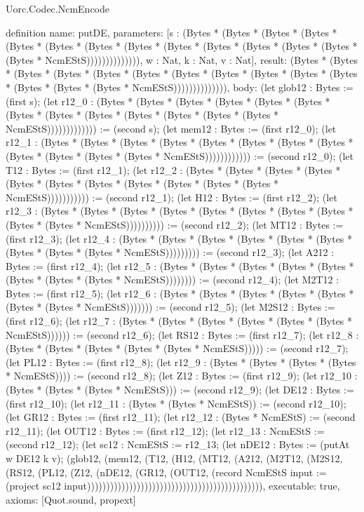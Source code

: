 \begin{lexlean}{Uorc.Codec.NcmEncode}
\begin{semanticmodule}
definition{
  name: putDE,
  parameters: [s : (Bytes * (Bytes * (Bytes * (Bytes * (Bytes * (Bytes * (Bytes * (Bytes * (Bytes * (Bytes * (Bytes * (Bytes * (Bytes * (Bytes * NcmEStS)))))))))))))), w : Nat, k : Nat, v : Nat],
  result: (Bytes * (Bytes * (Bytes * (Bytes * (Bytes * (Bytes * (Bytes * (Bytes * (Bytes * (Bytes * (Bytes * (Bytes * (Bytes * (Bytes * NcmEStS)))))))))))))),
  body: (let glob12 : Bytes := (first s); (let r12_0 : (Bytes * (Bytes * (Bytes * (Bytes * (Bytes * (Bytes * (Bytes * (Bytes * (Bytes * (Bytes * (Bytes * (Bytes * (Bytes * NcmEStS))))))))))))) := (second s); (let mem12 : Bytes := (first r12_0); (let r12_1 : (Bytes * (Bytes * (Bytes * (Bytes * (Bytes * (Bytes * (Bytes * (Bytes * (Bytes * (Bytes * (Bytes * (Bytes * NcmEStS)))))))))))) := (second r12_0); (let T12 : Bytes := (first r12_1); (let r12_2 : (Bytes * (Bytes * (Bytes * (Bytes * (Bytes * (Bytes * (Bytes * (Bytes * (Bytes * (Bytes * (Bytes * NcmEStS))))))))))) := (second r12_1); (let H12 : Bytes := (first r12_2); (let r12_3 : (Bytes * (Bytes * (Bytes * (Bytes * (Bytes * (Bytes * (Bytes * (Bytes * (Bytes * (Bytes * NcmEStS)))))))))) := (second r12_2); (let MT12 : Bytes := (first r12_3); (let r12_4 : (Bytes * (Bytes * (Bytes * (Bytes * (Bytes * (Bytes * (Bytes * (Bytes * (Bytes * NcmEStS))))))))) := (second r12_3); (let A212 : Bytes := (first r12_4); (let r12_5 : (Bytes * (Bytes * (Bytes * (Bytes * (Bytes * (Bytes * (Bytes * (Bytes * NcmEStS)))))))) := (second r12_4); (let M2T12 : Bytes := (first r12_5); (let r12_6 : (Bytes * (Bytes * (Bytes * (Bytes * (Bytes * (Bytes * (Bytes * NcmEStS))))))) := (second r12_5); (let M2S12 : Bytes := (first r12_6); (let r12_7 : (Bytes * (Bytes * (Bytes * (Bytes * (Bytes * (Bytes * NcmEStS)))))) := (second r12_6); (let RS12 : Bytes := (first r12_7); (let r12_8 : (Bytes * (Bytes * (Bytes * (Bytes * (Bytes * NcmEStS))))) := (second r12_7); (let PL12 : Bytes := (first r12_8); (let r12_9 : (Bytes * (Bytes * (Bytes * (Bytes * NcmEStS)))) := (second r12_8); (let Z12 : Bytes := (first r12_9); (let r12_10 : (Bytes * (Bytes * (Bytes * NcmEStS))) := (second r12_9); (let DE12 : Bytes := (first r12_10); (let r12_11 : (Bytes * (Bytes * NcmEStS)) := (second r12_10); (let GR12 : Bytes := (first r12_11); (let r12_12 : (Bytes * NcmEStS) := (second r12_11); (let OUT12 : Bytes := (first r12_12); (let r12_13 : NcmEStS := (second r12_12); (let sc12 : NcmEStS := r12_13; (let nDE12 : Bytes := (putAt w DE12 k v); (glob12, (mem12, (T12, (H12, (MT12, (A212, (M2T12, (M2S12, (RS12, (PL12, (Z12, (nDE12, (GR12, (OUT12, (record NcmEStS {input := (project sc12 input)}))))))))))))))))))))))))))))))))))))))))))))),
  executable: true,
  axioms: [Quot.sound, propext]
}


\end{semanticmodule}
\end{lexlean}
